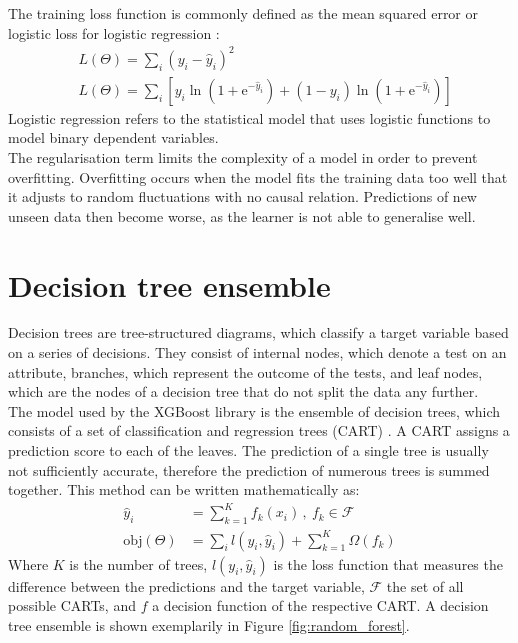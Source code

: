 The training loss function is commonly defined as the mean squared error or logistic loss for logistic regression \cite{logistic}:
\begin{align}
  &L(\Theta) = \sum_i (y_i - \hat{y}_i)^2 \\
  &L(\Theta) = \sum_i [y_i \ln{(1 + \text{e}^{-\hat{y}_i})} + (1 - y_i) \ln{(1 + \text{e}^{-\hat{y}_i})}]
\end{align}
Logistic regression refers to the statistical model that uses logistic functions to model binary dependent variables. \\
The regularisation term limits the complexity of a model in order to prevent overfitting. Overfitting occurs when the model fits the training data too well that it adjusts
to random fluctuations with no causal relation. Predictions of new unseen data then become worse, as the learner is not able to generalise well.

\section{Decision tree ensemble}
Decision trees are tree-structured diagrams, which classify a target variable based on a series of decisions. They consist of internal nodes, which denote
a test on an attribute, branches, which represent the outcome of the tests, and leaf nodes, which are the nodes of a decision tree that do not split the data any further. \\
The model used by the XGBoost library is the ensemble of decision trees, which consists of a set of classification and regression trees (CART) \cite{cart}.
A CART assigns a prediction score to each of the leaves.
The prediction of a single tree is usually not sufficiently accurate,
therefore the prediction of numerous trees is summed together. This method can be written mathematically as:
\begin{align}
  \hat{y}_i &= \sum_{k=1}^K f_k(x_i)\,, \: f_k \in \mathcal{F} \\
  \text{obj}(\Theta) &= \sum_i l(y_i, \hat{y}_i) + \sum_{k=1}^K \Omega(f_k)
\end{align}
Where $K$ is the number of trees, $l(y_i, \hat{y}_i)$ is the loss function that measures the difference between the predictions and the
target variable, $\mathcal{F}$ the set of all possible CARTs, and $f$ a decision function of the respective CART. A decision tree ensemble is shown exemplarily in
Figure \ref{fig:random_forest}.

